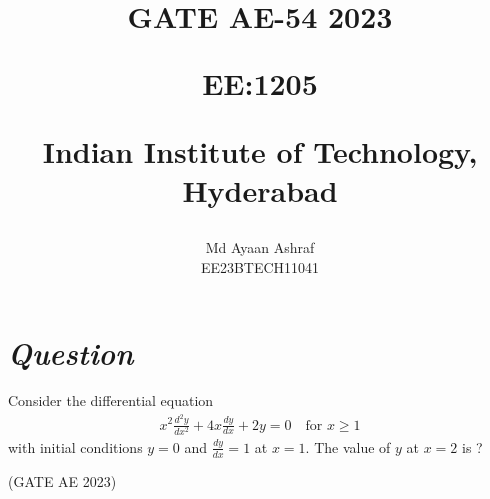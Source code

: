 \documentclass[journal,12pt,twocolumn]{IEEEtran}
\theoremstyle{remark}
\begin{document}
%




\vspace{3cm}

\title{
GATE AE-54 2023

\large{EE:1205 }

Indian Institute of Technology, Hyderabad
}
\author{Md Ayaan Ashraf

EE23BTECH11041
}  
\maketitle
\newpage
\bigskip
\renewcommand{\thefigure}{\arabic{figure}}
\renewcommand{\thetable}{\arabic{table}}
\section*{\textit{\textbf{Question}}}
Consider the differential equation
\begin{align}
x^2\frac{d^2y}{dx^2} + 4x\frac{dy}{dx} + 2y = 0 \quad \text{for } x\geq 1 \nonumber
\end{align}
with initial conditions $y=0$ and $\frac{dy}{dx} = 1$ at
$x = 1$. The value of $y$ at $x = 2$ is ?

\hfill {(GATE AE 2023)}
\end{document}
